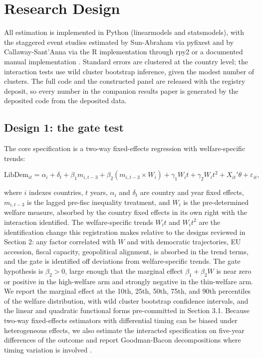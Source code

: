 \section{Research Design}

All estimation is implemented in Python (linearmodels and statsmodels), with the staggered event studies estimated by Sun-Abraham via pyfixest and by Callaway-Sant'Anna via the R implementation through rpy2 or a documented manual implementation \citep{Callaway2021, SunAbraham2021}. Standard errors are clustered at the country level; the interaction tests use wild cluster bootstrap inference, given the modest number of clusters. The full code and the constructed panel are released with the registry deposit, so every number in the companion results paper is generated by the deposited code from the deposited data.

\subsection{Design 1: the gate test}

The core specification is a two-way fixed-effects regression with welfare-specific trends:

\[
\text{LibDem}_{it} = \alpha_i + \delta_t + \beta_1 m_{i,t-3} + \beta_2 \left(m_{i,t-3} \times W_i\right) + \gamma_1 W_i t + \gamma_2 W_i t^2 + X_{it}'\theta + \varepsilon_{it},
\]

where $i$ indexes countries, $t$ years, $\alpha_i$ and $\delta_t$ are country and year fixed effects, $m_{i,t-3}$ is the lagged pre-fisc inequality treatment, and $W_i$ is the pre-determined welfare measure, absorbed by the country fixed effects in its own right with the interaction identified. The welfare-specific trends $W_i t$ and $W_i t^2$ are the identification change this registration makes relative to the designs reviewed in Section 2: any factor correlated with $W$ and with democratic trajectories, EU accession, fiscal capacity, geopolitical alignment, is absorbed in the trend terms, and the gate is identified off deviations from welfare-specific trends. The gate hypothesis is $\beta_2 > 0$, large enough that the marginal effect $\beta_1 + \beta_2 W$ is near zero or positive in the high-welfare arm and strongly negative in the thin-welfare arm. We report the marginal effect at the 10th, 25th, 50th, 75th, and 90th percentiles of the welfare distribution, with wild cluster bootstrap confidence intervals, and the linear and quadratic functional forms pre-committed in Section 3.1. Because two-way fixed-effects estimators with differential timing can be biased under heterogeneous effects, we also estimate the interacted specification on five-year differences of the outcome and report Goodman-Bacon decompositions where timing variation is involved \citep{GoodmanBacon2021}.

